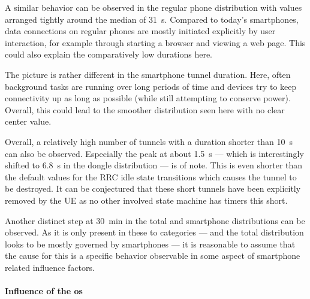 A similar behavior can be observed in the regular phone distribution with values arranged tightly around the median of \SI{31}{\second}. Compared to today's smartphones, data connections on regular phones are mostly initiated explicitly by user interaction, for example through starting a browser and viewing a web page. This could also explain the comparatively low durations here.

The picture is rather different in the smartphone tunnel duration. Here, often background tasks are running over long periods of time and devices try to keep connectivity up as long as possible (while still attempting to conserve power). Overall, this could lead to the smoother distribution seen here with no clear center value.

Overall, a relatively high number of tunnels with a duration shorter than \SI{10}{\second} can also be observed. Especially the peak at about \SI{1.5}{\second} --- which is interestingly shifted to \SI{6.8}{\second} in the dongle distribution --- is of note. This is even shorter than the default values for the \gls{RRC} idle state transitions which causes the tunnel to be destroyed. It can be conjectured that these short tunnels have been explicitly removed by the \gls{UE} as no other involved state machine has timers this short.

Another distinct step at \SI{30}{\minute} in the total and smartphone distributions can be observed. As it is only present in these to categories --- and the total distribution looks to be mostly governed by smartphones --- it is reasonable to assume that the cause for this is a specific behavior observable in some aspect of smartphone related influence factors.


\paragraph{Influence of the \texorpdfstring{\acrshort{os}}{OS}}

